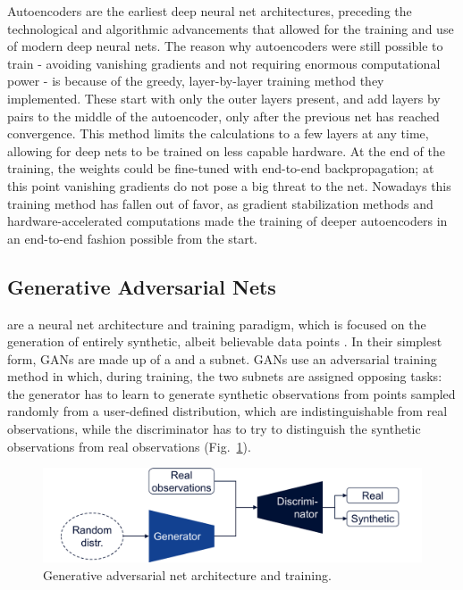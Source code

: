 			Autoencoders are the earliest deep neural net architectures, preceding the technological and algorithmic advancements that allowed for the training and use of modern deep neural nets.				
			The reason why autoencoders were still possible to train - avoiding vanishing gradients and not requiring enormous computational power - is because of the greedy, layer-by-layer training method they implemented. 
			These  start with only the outer layers present, and add layers by pairs to the middle of the autoencoder, only after the previous net has reached convergence.		
			This method limits the calculations to a few layers at any time, allowing for deep nets to be trained on less capable hardware.
			At the end of the training, the weights could be fine-tuned with end-to-end backpropagation; at this point vanishing gradients do not pose a big threat to the net. Nowadays this training method has fallen out of favor, as gradient stabilization methods and hardware-accelerated computations made the training of deeper autoencoders in an end-to-end fashion possible from the start.
		
		\subsection{Generative Adversarial Nets}
			\label{cha:deep_learning:sec:gan}
		
			 are a neural net architecture and training paradigm, which is focused on the generation of entirely synthetic, albeit believable data points \cite{gan}.
			In their simplest form, \acp{GAN} are made up of a  and a  subnet.
			\acp{GAN} use an adversarial training method in which, during training, the two subnets are assigned opposing tasks: the generator has to learn to generate synthetic observations from points sampled randomly from a user-defined distribution, which are indistinguishable from real observations, while the discriminator has to try to distinguish the synthetic observations from real observations (Fig.~\ref{fig:gan}).
			
			\begin{figure}[ht]
				\centering
				\includegraphics[width=0.8\linewidth]{figures/02_deep_learning/gan/gan.pdf}
				\caption[GAN architecture and training]{Generative adversarial net architecture and training.}
				\label{fig:gan}
			\end{figure}		
			
